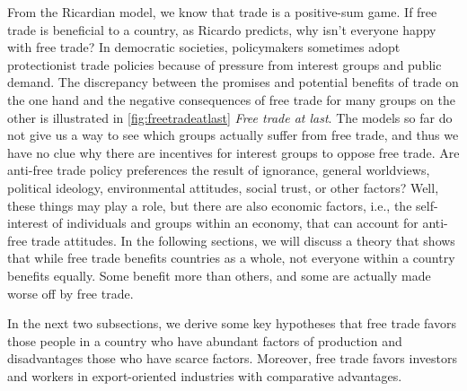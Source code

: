 {	\pbn
	From the Ricardian model, we know that trade is a positive-sum game. 
	If free trade is beneficial to a country, as Ricardo predicts, why isn't everyone happy with free trade? 
	In democratic societies, policymakers sometimes adopt protectionist trade policies because of pressure from interest groups and public demand. 
	The discrepancy between the promises and potential benefits of trade on the one hand and the negative consequences of free trade for many groups on the other is illustrated in \autoref{fig:freetradeatlast} \textit{Free trade at last}. The models so far do not give us a way to see which groups actually suffer from free trade, and thus we have no clue  why there are incentives for interest groups to oppose free trade. 
	Are anti-free trade policy preferences the result of ignorance, general worldviews, political ideology, environmental attitudes, social trust, or other factors? Well, these things may play a role, but there are also economic factors, i.e., the self-interest of individuals and groups within an economy, that can account for anti-free trade attitudes.
	In the following sections, we will discuss a theory that shows that while free trade benefits countries as a whole, not everyone within a country benefits equally. Some benefit more than others, and some are actually made worse off by free trade. 
	
	In the next two subsections, we derive some key hypotheses that free trade favors those people in a country who have abundant factors of production and disadvantages those who have scarce factors. Moreover, free trade favors investors and workers in export-oriented industries with comparative advantages.
	
	\pbn
}

